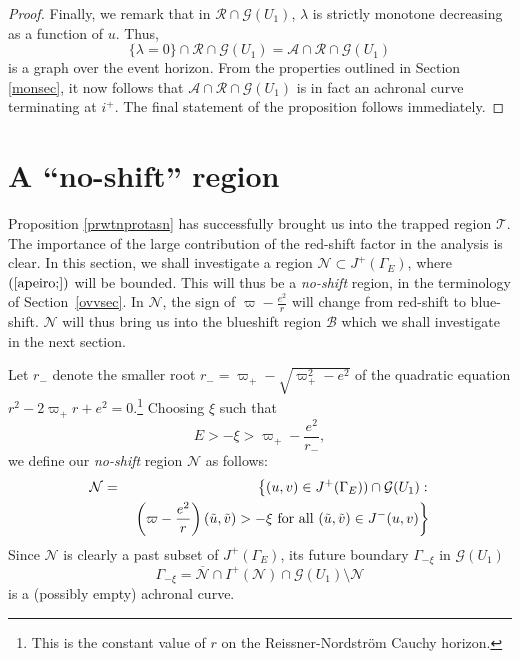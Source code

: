 \documentclass{article}
\begin{document}
{\begin{proof}
Finally, we remark that in $\mathcal{R}\cap\mathcal{G}(U_1)$, 
$\lambda$ is strictly monotone decreasing
as a function of $u$. Thus, 
\[
\{\lambda=0\}\cap \mathcal{R}\cap\mathcal{G}(U_1)=
\mathcal{A}\cap \mathcal{R}\cap
\mathcal{G}(U_1)
\]
is a graph over the event horizon. From the properties outlined in Section
\ref{monsec}, it now follows that $\mathcal{A}\cap \mathcal{R}\cap\mathcal{G}(U_1)$ 
is in fact an achronal curve
terminating at $i^+$. The final statement of the proposition follows
immediately. \end{proof}


\section{A ``no-shift'' region}
\label{nsrsec}
Proposition \ref{prwtnprotasn} has successfully brought us into the
trapped region $\mathcal{T}$. The importance of the large contribution
of the red-shift factor
in the analysis is clear.  
In this section, we shall investigate a region 
$\mathcal{N}\subset J^+(\Gamma_{E})$, where $(\ref{apeiro;})$ will be bounded.
This will thus be a \emph{no-shift} region, in the terminology of Section~\ref{ovvsec}.
In $\mathcal{N}$, the sign of $\varpi-\frac{e^2}r$ will change
from red-shift to blue-shift. $\mathcal{N}$ will thus bring
us into the blueshift region $\mathcal{B}$ which we shall investigate
in the next section.

Let $r_-$ denote the smaller root $r_-=\varpi_+-
\sqrt{\varpi_+^2-e^2}$ of the quadratic equation
$r^2-2\varpi_+r+e^2=0$.\footnote{This is the constant
value of $r$ on the Reissner-Nordstr\"om Cauchy horizon.} 
Choosing $\xi$ such that
\begin{equation}
\label{periergoasteri}
E>-\xi>\varpi_+-\frac{e^2}{r_-},
\end{equation}
we define our \emph{no-shift} region $\mathcal{N}$ as
follows:
\begin{eqnarray*}
\mathcal{N}&=&\left\{(u,v)\in J^+(\Gamma_{E}))
\cap\mathcal{G}(U_1):\right.\\
&&\hbox{}\left.
\left(\varpi-\frac{e^2}r\right)(\tilde{u},\tilde{v})
>-\xi{\rm\ for\ all\ }(\tilde{u},\tilde{v})\in J^-(u,v)\right\}
\end{eqnarray*}
Since $\mathcal{N}$ 
is clearly a past subset of $J^+(\Gamma_{E})$, 
its future boundary $\Gamma_{-\xi}$ in $\mathcal{G}(U_1)$
\[
\Gamma_{-\xi}=\overline{\mathcal{N}}\cap I^+(\mathcal{N})\cap\mathcal{G}(U_1)
\setminus\mathcal{N}
\]
is a (possibly empty) achronal curve.

}
\end{document}
